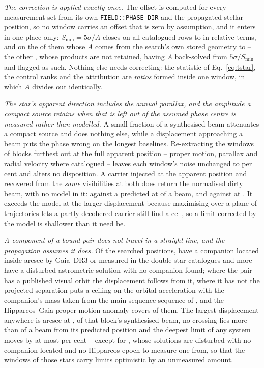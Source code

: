 \emph{The correction is applied exactly once.} The offset is computed for
every measurement set from its own \texttt{FIELD::PHASE\_DIR} and the
propagated stellar position, so no window carries an offset
that is zero by assumption, and it enters in one place only:
$S_{\min}=5\sigma/A$ closes on all \PbSminClosed{} catalogued rows to
\PbSminWorstRes{} in relative terms, and on the \PbSminIndep{} of them whose
$A$ comes from the search's own stored geometry to \PbSminIndepRes{} -- the
other \PbSminTaut, whose products are not retained, having $A$ back-solved
from $5\sigma/S_{\min}$ and flagged as such. Nothing else needs
correcting: the statistic of
Eq.~\ref{eq:tstar}, the control ranks and the attribution are \emph{ratios}
formed inside one window, in which $A$ divides out identically.

\emph{The star's apparent direction includes the annual parallax, and the
amplitude a compact source retains when that is left out of the assumed phase
centre is measured rather than modelled.} A small fraction of a synthesised
beam attenuates a compact source and does nothing else, while a displacement
approaching a beam puts the phase wrong on the longest baselines.
Re-extracting the \SensNReextWin{} windows of \SensNReextBlock{} blocks
furthest out at the full apparent position -- proper motion, parallax and
radial velocity where catalogued -- leaves each window's noise unchanged to
\SensReextNoiseMaxPct{} per cent and alters no disposition. A carrier
injected at the apparent position and recovered from the \emph{same}
visibilities at both does return the normalised dirty beam, with no model in
it: \SensPxSmallMeas{} against a predicted \SensPxSmallPred{} at
\SensPxSmallBeams{} of a beam, and \SensPxLargeMeas{} against
\SensPxLargePred{} at \SensPxLargeBeams. It exceeds the model at the larger
displacement because maximising over a plane of trajectories lets a partly
decohered carrier still find a cell, so a limit corrected by the model is
shallower than it need be.

\emph{A component of a bound pair does not travel in a straight line, and the
propagation assumes it does.} Of the \OmNStar{} searched positions,
\OmNComponent{} have a companion located inside \OmRadius{} arcsec by
Gaia~DR3 or measured in the double-star catalogues \citep{wds,orb6} and
\OmNIndOnly{} more have a disturbed astrometric solution with no companion
found; where the pair has a published visual orbit the displacement follows
from it, where it has not the projected separation puts a ceiling on the
orbital acceleration with the companion's mass taken from the main-sequence
sequence of \citet{pecaut2013}, and the Hipparcos--Gaia proper-motion
anomaly \citep{kervella2022} covers \OmNPma{} of them. The largest
displacement anywhere is \OmWorstArcsec{} arcsec at \OmWorstStar,
\OmWorstBeams{} of that block's synthesised beam, no crossing lies more than
\OmCrossWorstBeams{} of a beam from its predicted position and the deepest
limit of any system moves by at most \OmSysMovedMaxPct{} per cent -- except
for \OmFlagStars, whose solutions are disturbed with no companion located and
no Hipparcos epoch to measure one from, so that the \OmNWinFlag{} windows of
those \OmNFlag{} stars carry limits optimistic by an unmeasured amount.


